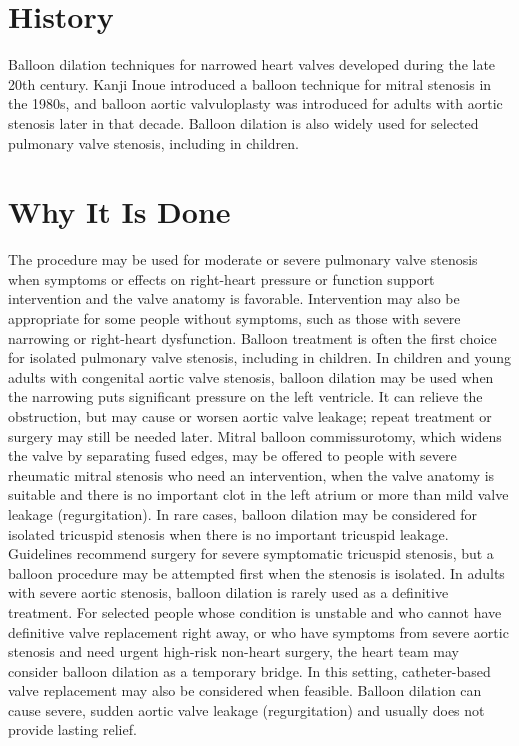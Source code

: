 \section*{History}
Balloon dilation techniques for narrowed heart valves developed during the late 20th century. Kanji Inoue introduced a balloon technique for mitral stenosis in the 1980s, and balloon aortic valvuloplasty was introduced for adults with aortic stenosis later in that decade. Balloon dilation is also widely used for selected pulmonary valve stenosis, including in children.

\section*{Why It Is Done}
The procedure may be used for moderate or severe pulmonary valve stenosis when symptoms or effects on right-heart pressure or function support intervention and the valve anatomy is favorable. Intervention may also be appropriate for some people without symptoms, such as those with severe narrowing or right-heart dysfunction. Balloon treatment is often the first choice for isolated pulmonary valve stenosis, including in children. In children and young adults with congenital aortic valve stenosis, balloon dilation may be used when the narrowing puts significant pressure on the left ventricle. It can relieve the obstruction, but may cause or worsen aortic valve leakage; repeat treatment or surgery may still be needed later. Mitral balloon commissurotomy, which widens the valve by separating fused edges, may be offered to people with severe rheumatic mitral stenosis who need an intervention, when the valve anatomy is suitable and there is no important clot in the left atrium or more than mild valve leakage (regurgitation). In rare cases, balloon dilation may be considered for isolated tricuspid stenosis when there is no important tricuspid leakage. Guidelines recommend surgery for severe symptomatic tricuspid stenosis, but a balloon procedure may be attempted first when the stenosis is isolated. In adults with severe aortic stenosis, balloon dilation is rarely used as a definitive treatment. For selected people whose condition is unstable and who cannot have definitive valve replacement right away, or who have symptoms from severe aortic stenosis and need urgent high-risk non-heart surgery, the heart team may consider balloon dilation as a temporary bridge. In this setting, catheter-based valve replacement may also be considered when feasible. Balloon dilation can cause severe, sudden aortic valve leakage (regurgitation) and usually does not provide lasting relief.

